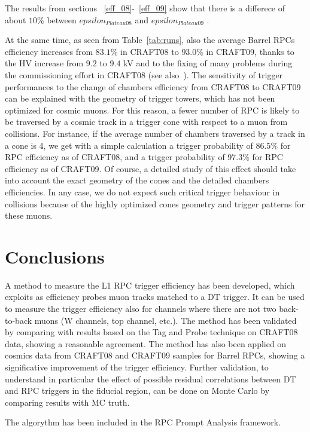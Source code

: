 The results from sections ~\ref{eff_08}-~\ref{eff_09} show that there is a differece of about
$10 \% $ between $epsilon_{Plateau08}$ and $epsilon_{Plateau09}$ .

At the same time, as seen from Table~\ref{tab:runs}, also the average Barrel RPCs 
efficiency increases from $83.1\%$ in CRAFT08 to $93.0\%$ in CRAFT09, thanks to the HV increase 
from $9.2$ to $9.4$ kV and to the fixing of many problems during the commissioning 
effort in CRAFT08 (see also~\cite{ref:craft08pap}). The sensitivity of trigger performances 
to the change of chambers efficiency from CRAFT08
to CRAFT09 can be explained with the geometry of trigger
towers, which has not been optimized for cosmic muons. For this reason,
a fewer number of RPC is likely to be traversed by a cosmic track 
in a trigger cone with respect to a muon from collisions. For instance, if the average number 
of chambers traversed by a track in a cone is 4, we get with a simple calculation 
a trigger probability of $86.5\%$ for RPC 
efficiency as of CRAFT08, and a trigger probability of 
$97.3\%$ for RPC efficiency as of CRAFT09. 
Of course, a detailed study of this effect should take into account the exact geometry of the 
cones and the detailed chambers efficiencies.
In any case, we do not expect such critical trigger behaviour in collisions because 
of the highly optimized cones geometry and trigger patterns for these muons.

\section{Conclusions}
A method to measure the L1 RPC trigger efficiency has been developed,
which exploits as efficiency probes muon tracks matched to a DT trigger. 
It can be used to measure the trigger efficiency also for channels where 
there are not two back-to-back muons (W channels, top channel, etc.).
The method has been validated by comparing with results based on the Tag and Probe 
technique on CRAFT08 data, showing a reasonable agreement.
The method has also been applied on cosmics data from CRAFT08 and CRAFT09
samples for Barrel RPCs, showing a significative improvement of the trigger efficiency.
Further validation, to understand in particular the effect of possible residual correlations
between DT and RPC triggers in the fiducial region, can be done on Monte Carlo by comparing 
results with MC truth.

The algorythm has been included in the RPC Prompt Analysis framework.



